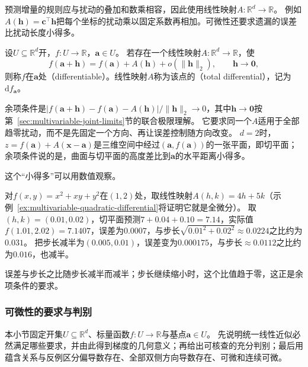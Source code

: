 预测增量的规则应与扰动的叠加和数乘相容，因此使用线性映射$A:\mathbb R^d\to\mathbb R$。
例如$A(\bm h)=\bm c^\top\bm h$把每个坐标的扰动乘以固定系数再相加。可微性还要求遗漏的误差比扰动长度小得多。
\begin{definition}[多元标量函数的可微性与全微分]
\label{def:multivariable-total-differential}
设$U\subseteq\mathbb R^d$开，$f:U\to\mathbb R$，$\bm a\in U$。
若存在一个线性映射$A:\mathbb R^d\to\mathbb R$，使
\begin{equation}
 f(\bm a+\bm h)=f(\bm a)+A(\bm h)+o(\lVert\bm h\rVert_2),
 \qquad\bm h\to\bm0,
\label{eq:analysis-total-differentiability}
\end{equation}
则称$f$在$\bm a$处（differentiable）。线性映射$A$称为该点的（total differential），记为$\mathrm df_{\bm a}$。
\end{definition}
余项条件是$|f(\bm a+\bm h)-f(\bm a)-A(\bm h)|/\lVert\bm h\rVert_2\to0$，其中$\bm h\to\bm 0$按第~\ref{sec:multivariable-joint-limits}节的联合极限理解。
它要求同一个$A$适用于全部趋零扰动，而不是先固定一个方向、再让误差控制随方向改变。
$d=2$时，$z=f(\bm a)+A(\bm x-\bm a)$是三维空间中经过$(\bm a,f(\bm a))$的一张平面，即切平面；余项条件说的是，曲面与切平面的高度差比到$\bm a$的水平距离小得多。

这个“小得多”可以用数值观察。
\begin{example}[切平面误差随步长缩小]
\label{ex:multivariable-tangent-plane-error}
对$f(x,y)=x^2+xy+y^2$在$(1,2)$处，取线性映射$A(h,k)=4h+5k$（示例~\ref{ex:multivariable-quadratic-differential}将证明它就是全微分）。
取$(h,k)=(0.01,0.02)$，切平面预测$7+0.04+0.10=7.14$，实际值$f(1.01,2.02)=7.1407$，误差为$0.0007$，与步长$\sqrt{0.01^2+0.02^2}\approx0.0224$之比约为$0.031$。
把步长减半为$(0.005,0.01)$，误差变为$0.000175$，与步长$\approx0.0112$之比约为$0.016$，也减半。
\end{example}

误差与步长之比随步长减半而减半；步长继续缩小时，这个比值趋于零，这正是余项条件的要求。

\subsubsection{可微性的要求与判别}
\label{sec:analysis-differentiability-relations}

本小节固定开集$U\subseteq\mathbb R^d$、标量函数$f:U\to\mathbb R$与基点$\bm a\in U$。
先说明统一线性近似必然满足哪些要求，并由此得到梯度的几何意义；再给出可核查的充分判别；最后用蕴含关系与反例区分偏导数存在、全部双侧方向导数存在、可微和连续可微。

